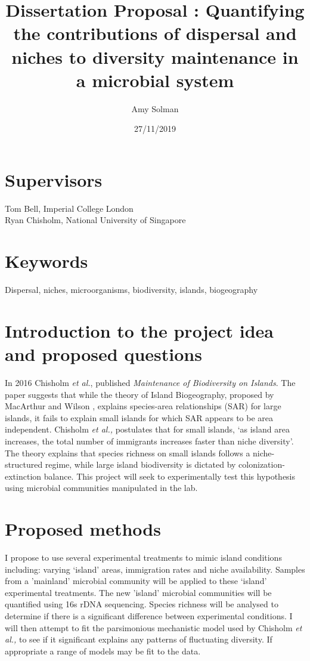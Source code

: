 \documentclass[11pt]{article}
\title{Dissertation Proposal : Quantifying the contributions of dispersal and niches to diversity maintenance in a microbial system}
\author{Amy Solman}
\date{27/11/2019}
\begin{document}
  \maketitle
  
  \section{Supervisors}
  Tom Bell, Imperial College London \\
  Ryan Chisholm, National University of Singapore
  
  \section{Keywords}
  Dispersal, niches, microorganisms, biodiversity, islands, biogeography

  \section{Introduction to the project idea and proposed questions}
  In 2016 Chisholm \textit{et al.}, published \textit{Maintenance of Biodiversity on Islands}\cite{chisholm2016maintenance}. The paper suggests that while the theory of Island Biogeography, proposed by MacArthur and Wilson \cite{wilson1967theory}, explains species-area relationships (SAR) for large islands, it fails to explain small islands for which SAR appears to be area independent. Chisholm \textit{et al.,} postulates that for small islands, ‘as island area increases, the total number of immigrants increases faster than niche diversity’. The theory explains that species richness on small islands follows a niche-structured regime, while large island biodiversity is dictated by colonization-extinction balance. This project will seek to experimentally test this hypothesis using microbial communities manipulated in the lab. 
  
  \section{Proposed methods}
  I propose to use several experimental treatments to mimic island conditions including: varying ‘island’ areas, immigration rates and niche availability. Samples from a 'mainland' microbial community will be applied to these ‘island’ experimental treatments. The new 'island' microbial communities will be quantified using 16s rDNA sequencing. Species richness will be analysed to determine if there is a significant difference between experimental conditions. I will then attempt to fit the parsimonious mechanistic model used by Chisholm \textit{et al.,} to see if it significant explains any patterns of fluctuating diversity. If appropriate a range of models may be fit to the data.
  
\end{document}
